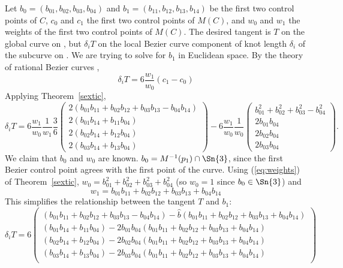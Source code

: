 \documentclass[12pt]{article}
\begin{document}
Let $b_0 = (b_{01}, b_{02}, b_{03}, b_{04})$ and 
$b_1 = (b_{11}, b_{12}, b_{13}, b_{14})$ be 
the first two control points of $C$,
$c_0$ and $c_1$ the first two control points of $M(C)$,
and $w_0$ and $w_1$ the weights of the first two control points of $M(C)$.
The desired tangent is $T$ on the global curve on ,
but $\delta_i T$ on the local Bezier curve component of knot length $\delta_i$
of the subcurve on .
We are trying to solve for $b_1$ in Euclidean space.
By the theory of rational Bezier curves \cite{farin97},
\[
	\delta_i T = 6 \frac{w_1}{w_0} (c_1 - c_0)
\]
Applying Theorem~\ref{sextic}, 
\[
	\delta_i T = 6 \frac{w_1}{w_0} \frac{1}{w_1} \frac{3}{6}
	\left(
	\begin{array}{c}
	2(b_{01}b_{11} + b_{02}b_{12} + b_{03}b_{13} - b_{04}b_{14})\\
	2(b_{01}b_{14} + b_{11}b_{04})\\
	2(b_{02}b_{14} + b_{12}b_{04})\\
	2(b_{03}b_{14} + b_{13}b_{04})
	\end{array} \right)
	- 6 \frac{w_1}{w_0} \frac{1}{w_0}
	\left(
	\begin{array}{c}
	b_{01}^2 + b_{02}^2 + b_{03}^2 - b_{04}^2\\
	2b_{01}b_{04}\\
	2b_{02}b_{04}\\
	2b_{03}b_{04}
	\end{array} \right).
\]
We claim that $b_0$ and $w_0$ are known.
$b_0 = M^{-1}(p_1) \cap \Sn{3}$, since the first Bezier control point agrees
with the first point of the curve.
Using (\ref{eq:weights}) of Theorem~\ref{sextic},
$w_0 = b_{01}^2 + b_{02}^2 + b_{03}^2 + b_{04}^2$ 
(so $w_0=1$ since $b_0 \in \Sn{3}$)
and
\[
  w_1 = b_{01}b_{11} + b_{02}b_{12} + b_{03}b_{13} + b_{04}b_{14}
\]
This simplifies the relationship between the tangent $T$ and $b_1$:
\[
	\delta_i T = 6 \left( \begin{array}{c}
	(b_{01}b_{11} + b_{02}b_{12} + b_{03}b_{13} - b_{04}b_{14})
	- \hat{b} 
	  (b_{01}b_{11} + b_{02}b_{12} + b_{03}b_{13} + b_{04}b_{14}) \\
	(b_{01}b_{14} + b_{11}b_{04})
	- 2b_{01}b_{04} 
	  (b_{01}b_{11} + b_{02}b_{12} + b_{03}b_{13} + b_{04}b_{14}) \\
	(b_{02}b_{14} + b_{12}b_{04})
	- 2b_{02}b_{04}
	  (b_{01}b_{11} + b_{02}b_{12} + b_{03}b_{13} + b_{04}b_{14}) \\
	(b_{03}b_{14} + b_{13}b_{04})
	- 2b_{03}b_{04}
	  (b_{01}b_{11} + b_{02}b_{12} + b_{03}b_{13} + b_{04}b_{14}) \\
	\end{array} \right)
\]
\end{document}
